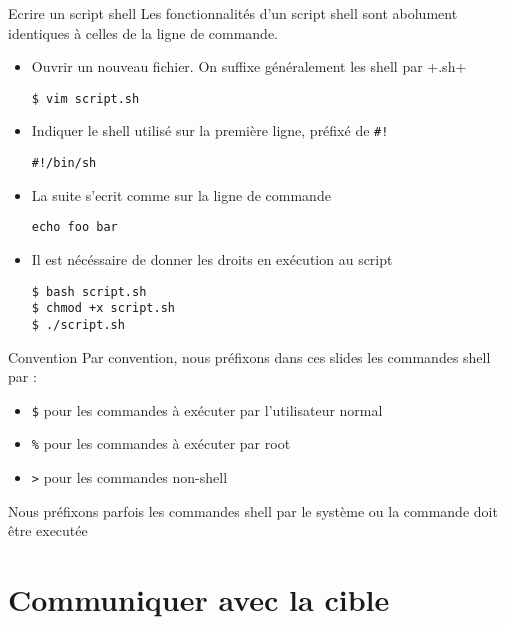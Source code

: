 \begin{frame}[fragile=singleslide]{Ecrire un script shell}
  Les  fonctionnalités d'un  script  shell sont  abolument identiques  à
  celles de la ligne de commande.
  \begin{itemize}
  \item Ouvrir  un nouveau fichier. On suffixe  généralement les shell
    par \file+.sh+
    \begin{lstlisting}
$ vim script.sh
    \end{lstlisting} %
  \item Indiquer  le shell utilisé  sur la première ligne,  préfixé de
    \verb+#!+
    \begin{lstlisting}
#!/bin/sh
    \end{lstlisting} %
  \item La suite s'ecrit comme sur la ligne de commande
    \begin{lstlisting}
echo foo bar
    \end{lstlisting} %
  \item Il est nécéssaire de donner les droits en exécution au script
    \begin{lstlisting}
$ bash script.sh
$ chmod +x script.sh
$ ./script.sh
    \end{lstlisting} %
  \end{itemize}
\end{frame}

\begin{frame}[fragile=singleslide]{Convention}
  Par convention,  nous préfixons dans ces slides  les commandes shell
  par :
  \begin{itemize}
  \item  \verb+$+  pour les  commandes  à  exécuter par  l'utilisateur
    normal
  \item \verb+%+ pour les commandes à exécuter par root
  \item \verb+>+ pour les commandes non-shell
  \end{itemize}
  Nous  préfixons parfois  les commandes  shell par  le système  ou la
  commande doit être executée
\end{frame}

\section{Communiquer avec la cible}

